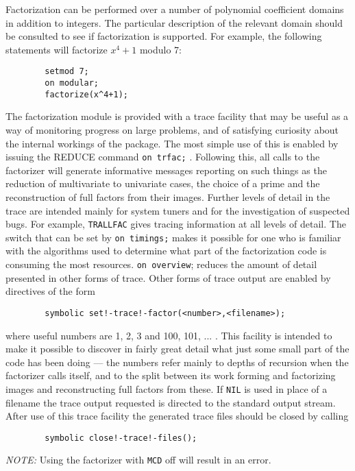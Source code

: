 \documentclass[11pt,letterpaper]{book}
\makeatletter
\newcommand{\REDUCE}{REDUCE}
\newcommand{\underscore}{\_}
\newcommand{\ttindex}[1]{{\renewcommand{\_}{\protect\underscore}%
                          \index{#1@{\tt #1}}}}
\makeatother
\begin{document}
Factorization can be performed over a number of polynomial coefficient
domains in addition to integers. The particular description of the relevant
domain should be consulted to see if factorization is supported. For
example, the following statements will factorize $x^{4}+1$ modulo 7:
{\small\begin{verbatim}
        setmod 7;
        on modular;
        factorize(x^4+1);
\end{verbatim}}
The factorization module is provided with a trace facility that may be useful
as a way of monitoring progress on large problems, and of satisfying
curiosity about the internal workings of the package. The most simple use
of this is enabled by issuing the {\REDUCE} command\ttindex{TRFAC}
{\tt on trfac;} .
Following this, all calls to the factorizer will generate informative
messages reporting on such things as the reduction of multivariate to
univariate cases, the choice of a prime and the reconstruction of full
factors from their images.  Further levels of detail in the trace are
intended mainly for system tuners and for the investigation of suspected
bugs.  For example, {\tt TRALLFAC} gives tracing information at all levels
of detail.  The switch that can be set by {\tt on timings;} makes it
possible for one who is familiar with the algorithms used to determine
what part of the factorization code is consuming the most resources.
{\tt on overview}; reduces the amount of detail presented in other forms of
trace.  Other forms of trace output are enabled by directives of the form
{\small\begin{verbatim}
        symbolic set!-trace!-factor(<number>,<filename>);
\end{verbatim}}
where useful numbers are 1, 2, 3 and 100, 101, ... .  This facility is
intended to make it possible to discover in fairly great detail what just
some small part of the code has been doing --- the numbers refer mainly to
depths of recursion when the factorizer calls itself, and to the split
between its work forming and factorizing images and reconstructing full
factors from these.  If {\tt NIL} is used in place of a filename the trace
output requested is directed to the standard output stream.  After use of
this trace facility the generated trace files should be closed by calling
{\small\begin{verbatim}
        symbolic close!-trace!-files();
\end{verbatim}}
{\it NOTE:} Using the factorizer with {\tt MCD}\ttindex{MCD} off will
result in an error.
\end{document}
